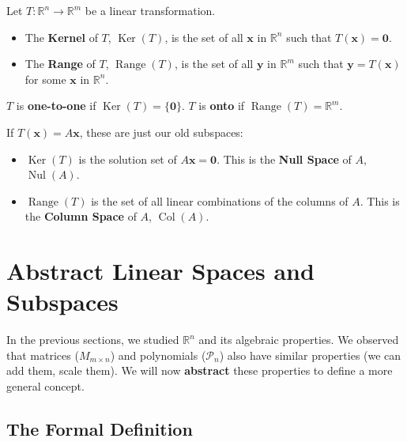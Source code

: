 \begin{definition}
Let $T: \mathbb{R}^n \to \mathbb{R}^m$ be a linear transformation.
\begin{itemize}
    \item The \textbf{Kernel} of $T$, $\operatorname{Ker}(T)$, is the set of all $\mathbf{x}$ in $\mathbb{R}^n$ such that $T(\mathbf{x}) = \mathbf{0}$.
    \item The \textbf{Range} of $T$, $\operatorname{Range}(T)$, is the set of all $\mathbf{y}$ in $\mathbb{R}^m$ such that $\mathbf{y} = T(\mathbf{x})$ for some $\mathbf{x}$ in $\mathbb{R}^n$.
\end{itemize}
$T$ is \textbf{one-to-one} if $\operatorname{Ker}(T) = \{\mathbf{0}\}$.
$T$ is \textbf{onto} if $\operatorname{Range}(T) = \mathbb{R}^m$.
\end{definition}
If $T(\mathbf{x}) = A\mathbf{x}$, these are just our old subspaces:
\begin{itemize}
    \item $\operatorname{Ker}(T)$ is the solution set of $A\mathbf{x} = \mathbf{0}$. This is the \textbf{Null Space} of $A$, $\operatorname{Nul}(A)$.
    \item $\operatorname{Range}(T)$ is the set of all linear combinations of the columns of $A$. This is the \textbf{Column Space} of $A$, $\operatorname{Col}(A)$.
\end{itemize}

\section{Abstract Linear Spaces and Subspaces}
In the previous sections, we studied $\mathbb{R}^n$ and its algebraic properties. We observed that matrices ($M_{m \times n}$) and polynomials ($\mathcal{P}_n$) also have similar properties (we can add them, scale them). We will now \textbf{abstract} these properties to define a more general concept.

\subsection{The Formal Definition}

